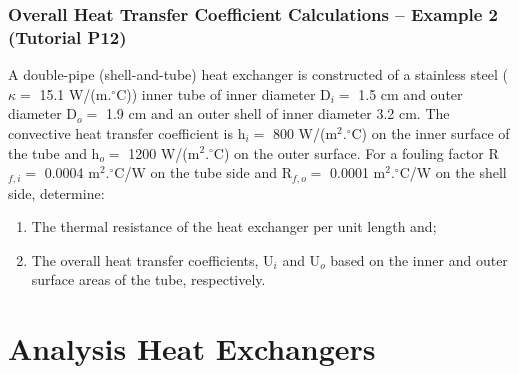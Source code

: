 \documentclass[10pt,compress,unknownkeysallowed]{beamer}
\begin{document}
\begin{frame}
  \frametitle{Overall Heat Transfer Coefficient Calculations -- Example 2 (Tutorial P12)}

A double-pipe (shell-and-tube) heat exchanger is constructed of a stainless steel ($\kappa=$ 15.1 W/(m.$^{\circ}$C)) inner tube of inner diameter D$_{i}=$ 1.5 cm and outer diameter D$_{o}=$ 1.9 cm and an outer shell of inner diameter 3.2 cm. The convective heat transfer coefficient is h$_{i}=$ 800 W/(m$^{2}.^{\circ}$C) on the inner surface of the tube and h$_{o}=$ 1200 W/(m$^{2}.^{\circ}$C) on the outer surface. For a fouling factor R$_{f,i}=$ 0.0004 m$^{2}.^{\circ}$C/W on the tube side and R$_{f,o}=$ 0.0001 m$^{2}.^{\circ}$C/W on the shell side, determine:
\begin{enumerate}
   \item The thermal resistance of the heat exchanger per unit length and; 
   \item The overall heat transfer coefficients, U$_{i}$ and U$_{o}$ based on the inner and outer surface areas of the tube, respectively.
\end{enumerate}

\end{frame}


\section{Analysis Heat Exchangers}
\end{document}
